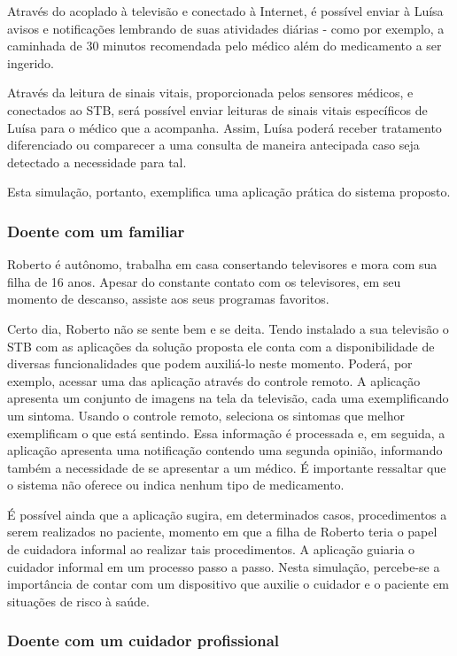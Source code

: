 Através do \stb[] acoplado à televisão e conectado à Internet, é
possível enviar à Luísa avisos e notificações lembrando de suas atividades
diárias - como por exemplo, a caminhada de 30 minutos recomendada pelo
médico além do medicamento a ser ingerido.

Através da leitura de sinais vitais, proporcionada pelos sensores médicos,
e conectados ao STB, será possível enviar leituras de sinais vitais específicos 
de Luísa para o médico que a acompanha. Assim, Luísa poderá receber tratamento
diferenciado ou comparecer a uma consulta de maneira antecipada caso seja
detectado a necessidade para tal.

Esta simulação, portanto, exemplifica uma aplicação prática do sistema 
proposto.

\subsubsection{Doente com um familiar}

Roberto é autônomo, trabalha em casa consertando televisores e mora com sua
filha de 16 anos. Apesar do constante contato com os televisores, em seu momento
de descanso, assiste aos seus programas favoritos.

Certo dia, Roberto não se sente bem e se deita. Tendo instalado a sua televisão
o STB com as aplicações da solução proposta ele conta com a disponibilidade de
diversas funcionalidades que podem auxiliá-lo neste momento. Poderá, por
exemplo, acessar uma das aplicação através do controle remoto. A aplicação
apresenta um conjunto de imagens na tela da televisão, cada uma exemplificando
um sintoma.  Usando o controle remoto, seleciona os sintomas que melhor
exemplificam o que está sentindo. Essa informação é processada e, em seguida, a
aplicação apresenta uma notificação contendo uma segunda opinião, informando
também a necessidade de se apresentar a um médico. É importante ressaltar que
o sistema não oferece ou indica nenhum tipo de medicamento.

É possível ainda que a aplicação sugira, em determinados casos, procedimentos a
serem realizados no paciente, momento em que a filha de Roberto teria o papel de
cuidadora informal ao realizar tais procedimentos. A aplicação guiaria o
cuidador informal em um processo passo a passo. Nesta simulação,  percebe-se a
importância de contar com um dispositivo que auxilie o cuidador e o paciente em
situações de risco à saúde.

\subsubsection{Doente com um cuidador profissional}

